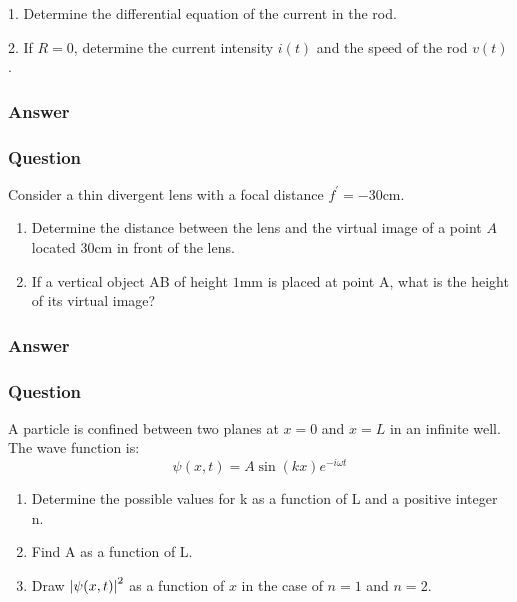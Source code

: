 1. Determine the differential equation of the current in the rod.

2. If $R = 0$, determine the current intensity $i(t)$ and the speed of the rod $v(t)$.
\subsubsection{Answer}

\subsubsection{Question}
Consider a thin divergent lens with a focal distance $f^\prime = -30$cm.
\begin{enumerate}
	\item Determine the distance between the lens and the virtual image of a point $A$ located $30$cm in front of the lens.
	\item If a vertical object AB of height $1$mm is placed at point A, what is the height of its virtual image?
\end{enumerate}
\subsubsection{Answer}



\subsubsection{Question}
A particle is confined between two planes at $x = 0$ and $x = L$ in an infinite well. The wave function is: $$\psi(x,t) = A\sin(kx) e^{-i\omega t}$$
\begin{enumerate}
	\item Determine the possible values for k as a function of L and a positive integer n.
	\item Find A as a function of L.
	\item Draw $\abs{\psi(x,t)}^2$ as a function of $x$ in the case of $n=1$ and $n=2$.
\end{enumerate}
